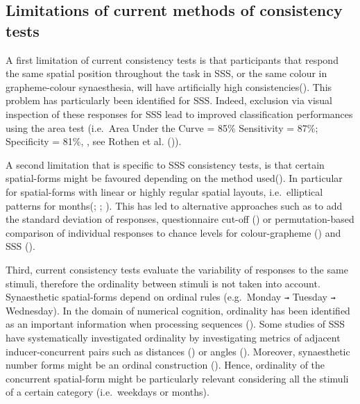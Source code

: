 \documentclass[
  man,
  floatsintext,
  longtable,
  a4paper,
  nolmodern,
  notxfonts,
  notimes,
  colorlinks=true,linkcolor=blue,citecolor=blue,urlcolor=blue]{apa7}
\begin{document}
\subsection{Limitations of current methods of consistency
tests}\label{limitations-of-current-methods-of-consistency-tests}



A first limitation of current consistency tests is that participants
that respond the same spatial position throughout the task in SSS, or
the same colour in grapheme-colour synaesthesia, will have artificially
high consistencies(). This
problem has particularly been identified for SSS. Indeed, exclusion via
visual inspection of these responses for SSS lead to improved
classification performances using the area test (i.e.~Area Under the
Curve = 85\% Sensitivity = 87\%; Specificity = 81\%, , see Rothen et al.
()).

A second limitation that is specific to SSS consistency tests, is that
certain spatial-forms might be favoured depending on the method
used(). In particular for
spatial-forms with linear or highly regular spatial layouts,
i.e.~elliptical patterns for months(; ;
). This has led to
alternative approaches such as to add the standard deviation of
responses, questionnaire cut-off () or permutation-based comparison of individual responses to chance
levels for colour-grapheme ()
and SSS ().

Third, current consistency tests evaluate the variability of responses
to the same stimuli, therefore the ordinality between stimuli is not
taken into account. Synaesthetic spatial-forms depend on ordinal rules
(e.g.~Monday \texttt{→} Tuesday \texttt{→} Wednesday). In the domain of
numerical cognition, ordinality has been identified as an important
information when processing sequences (). Some studies of SSS have systematically investigated
ordinality by investigating metrics of adjacent inducer-concurrent pairs
such as distances () or
angles (). Moreover,
synaesthetic number forms might be an ordinal construction
(). Hence, ordinality of the
concurrent spatial-form might be particularly relevant considering all
the stimuli of a certain category (i.e.~weekdays or months).
\end{document}
